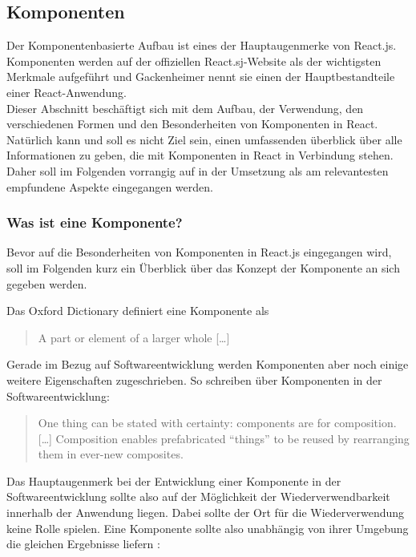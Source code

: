 \subsection{Komponenten}
Der Komponentenbasierte Aufbau ist eines der Hauptaugenmerke von React.js. Komponenten werden auf der offiziellen React.sj-Website \footnotemark als der wichtigsten Merkmale aufgeführt und Gackenheimer \cite[S. 28]{Gackenheimer201509} nennt sie einen der Hauptbestandteile einer React-Anwendung. \\
Dieser Abschnitt beschäftigt sich mit dem Aufbau, der Verwendung, den verschiedenen Formen und den Besonderheiten von Komponenten in React. \\
Natürlich kann und soll es nicht Ziel sein, einen umfassenden überblick über alle Informationen zu geben, die mit Komponenten in React in Verbindung stehen. Daher soll im Folgenden vorrangig auf in der Umsetzung als am relevantesten empfundene Aspekte eingegangen werden.


\subsubsection{Was ist eine Komponente?}
Bevor auf die Besonderheiten von Komponenten in React.js eingegangen wird, soll im Folgenden kurz ein Überblick über das Konzept der Komponente an sich gegeben werden.

Das Oxford Dictionary definiert eine Komponente als

\begin{quote}
  A part or element of a larger whole […]
\end{quote}

Gerade im Bezug auf Softwareentwicklung werden Komponenten aber noch einige weitere Eigenschaften zugeschrieben. So schreiben \cite{Szyperski200211} über Komponenten in der Softwareentwicklung:


\begin{quote}
  One thing can be stated with certainty: components are for composition. […] Composition enables prefabricated “things” to be reused by rearranging them in ever-new composites.
\end{quote}

Das Hauptaugenmerk bei der Entwicklung einer Komponente in der Softwareentwicklung sollte also auf der Möglichkeit der Wiederverwendbarkeit innerhalb der Anwendung liegen. Dabei sollte der Ort für die Wiederverwendung keine Rolle spielen. Eine Komponente sollte also unabhängig von ihrer Umgebung die gleichen Ergebnisse liefern \cite{de2001interface}:


